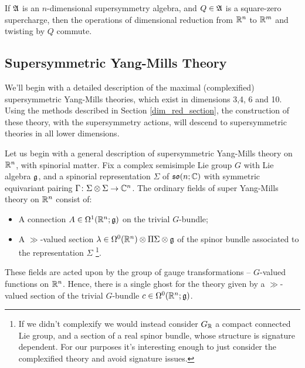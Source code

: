 \documentclass[10pt, oneside]{article}
\begin{document}

\begin{lemma}
If $\mathfrak{A}$ is an $n$-dimensional supersymmetry algebra, and $Q \in \mathfrak{A}$ is a square-zero supercharge, then the operations of dimensional reduction from $\mathbb R^n$ to $\mathbb R^m$ and twisting by $Q$ commute.
\end{lemma}


\subsection{Supersymmetric Yang-Mills Theory}
We'll begin with a detailed description of the maximal (complexified) supersymmetric Yang-Mills theories, which exist in dimensions 3,4, 6 and 10.  Using the methods described in Section \ref{dim_red_section}, the construction of these theory, with the supersymmetry actions, will descend to supersymmetric theories in all lower dimensions.  

Let us begin with a general description of supersymmetric Yang-Mills theory on $\mathbb R^n$, with spinorial matter.  Fix a complex semisimple Lie group $G$ with Lie algebra $\mathfrak g$, and a spinorial representation $\Sigma$ of $\mathfrak{so}(n;\mathbb C)$ with symmetric equivariant pairing $\Gamma \colon \Sigma \otimes \Sigma \to \mathbb C^n$.  The ordinary fields of super Yang-Mills theory on $\mathbb R^{n}$ consist of:
\begin{itemize}
\item A connection $A \in \Omega^1(\mathbb R^{n} ; \mathfrak g)$ on the trivial $G$-bundle;
\item A $\gg$-valued section $\lambda \in \Omega^0(\mathbb R^{n}) \otimes \Pi \Sigma \otimes \mathfrak g$ of the spinor bundle associated to the representation $\Sigma$
\footnote{If we didn't complexify we would instead consider $G_\mathbb R$ a compact connected Lie group, and a section of a real spinor bundle, whose structure is signature dependent.  For our purposes it's interesting enough to just consider the complexified theory and avoid signature issues.}.  
\end{itemize}
These fields are acted upon by the group of gauge transformations -- $G$-valued functions on $\mathbb R^{n}$. 
Hence, there is a single ghost for the theory given by a $\gg$-valued section of the trivial $G$-bundle $c \in \Omega^0(\mathbb R^{n} ; \mathfrak g)$. 
\end{document}
